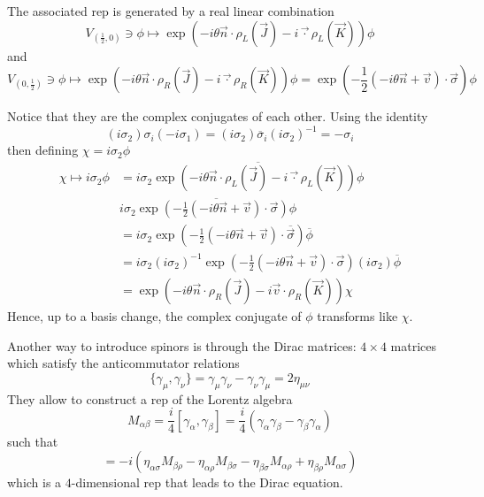     The associated rep is generated by a real linear combination 
    \begin{equation*}
        V_{(\frac{1}{2}, 0)} \ni \phi \mapsto \exp(-i \theta \vec n \cdot \rho_L(\vec J) - i \vec \cdot \rho_L(\vec K)) \phi
    \end{equation*}
    and 
    \begin{equation*}
        V_{(0, \frac{1}{2})} \ni \phi \mapsto \exp(-i \theta \vec n \cdot \rho_R(\vec J) - i \vec \cdot \rho_R(\vec K)) \phi = \exp(-\frac{1}{2} (- i \theta \vec n + \vec v) \cdot \vec \sigma) \phi
    \end{equation*}

    Notice that they are the complex conjugates of each other. Using the identity
    \begin{equation*}
        (i \sigma_2) \sigma_i (- i \sigma_1) = (i \sigma_2) \overline \sigma_i (i \sigma_2)^{-1} = - \sigma_i
    \end{equation*}
    then defining $\chi = i \sigma_2 \phi$ 
    \begin{equation*}
    \begin{aligned}
        \chi \mapsto i \sigma_2 \phi & = i \sigma_2 \overline{\exp(-i \theta \vec n \cdot \rho_L(\vec J) - i \vec \cdot \rho_L(\vec K)) \phi} \\ & i \sigma_2 \overline{\exp(-\frac{1}{2} (- i \theta \vec n + \vec v) \cdot \vec \sigma) \phi} \\ & = i \sigma_2 \exp(-\frac{1}{2} (- i \theta \vec n + \vec v) \cdot \overline{\vec \sigma}) \overline \phi \\ & = i \sigma_2 (i \sigma_2)^{-1} \exp(-\frac{1}{2} (- i \theta \vec n + \vec v) \cdot \vec \sigma) (i \sigma_2) \overline \phi \\ & = \exp(- i \theta \vec n \cdot \rho_R(\vec J) - i \vec v \cdot \rho_R (\vec K)) \chi
    \end{aligned}
    \end{equation*}
    Hence, up to a basis change, the complex conjugate of $\phi$ transforms like $\chi$. 

    Another way to introduce spinors is through the Dirac matrices: $4 \times 4$ matrices which satisfy the anticommutator relations 
    \begin{equation*}
        \{\gamma_\mu, \gamma_\nu\} = \gamma_\mu \gamma_\nu - \gamma_\nu \gamma_\mu = 2 \eta_{\mu\nu}
    \end{equation*}
    They allow to construct a rep of the Lorentz algebra 
    \begin{equation*}
        M_{\alpha\beta} = \frac{i}{4} [\gamma_\alpha, \gamma_\beta] = \frac{i}{4} (\gamma_\alpha \gamma_\beta - \gamma_\beta \gamma_\alpha)
    \end{equation*}
    such that 
    \begin{equation*}
        [M_{\alpha\beta}, M_{\sigma\rho}] = - i (\eta_{\alpha\sigma} M_{\beta \rho} - \eta_{\alpha\rho} M_{\beta\sigma} - \eta_{\beta\sigma} M_{\alpha\rho} + \eta_{\beta\rho} M_{\alpha\sigma})
    \end{equation*}
    which is a $4$-dimensional rep that leads to the Dirac equation.

